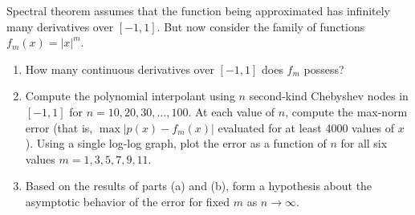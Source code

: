 \begin{exercise}

	Spectral theorem assumes that the function being approximated has infinitely
	many derivatives over $[-1,1]$. But now consider the family of functions
	$f_m(x)=|x|^m$.
	\begin{enumerate}
		\item How many continuous derivatives over $[-1,1]$ does $f_m$ possess?
		\item Compute the polynomial interpolant using $n$ second-kind Chebyshev
		      nodes in $[-1,1]$ for $n=10,20,30,\ldots,100$. At each value of $n$, compute the
		      max-norm error (that is, $\max |p(x)-f_m(x)|$ evaluated for at least 4000 values
		      of $x$). Using a single log-log graph, plot the error as a function of $n$ for
		      all six values $m=1,3,5,7,9,11$.
		\item Based on the results of parts (a) and (b), form a hypothesis about the
		      asymptotic behavior of the error for fixed $m$ as $n\rightarrow \infty$.
	\end{enumerate}

\end{exercise}

